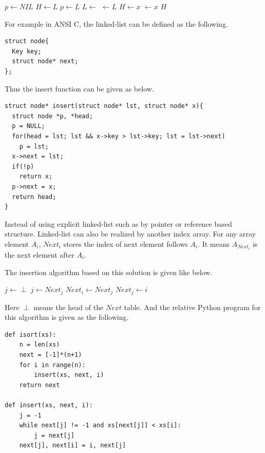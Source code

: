 \documentclass[UTF8]{article}
\begin{document}
\begin{algorithmic}
  \State $p \gets NIL$
  \State $H \gets L$
    \State $p \gets L$
    \State $L \gets $ 
  \EndWhile
  \State {} $\gets L$
    \State $H \gets x$
  \Else
    \State {} $\gets x$
  \EndIf
  \State \Return $H$
\EndFunction
\end{algorithmic}

For example in ANSI C, the linked-list can be defined as the following.

\lstset{language=C}
\begin{lstlisting}
struct node{
  Key key;
  struct node* next;
};
\end{lstlisting}

Thus the insert function can be given as below.

\begin{lstlisting}
struct node* insert(struct node* lst, struct node* x){
  struct node *p, *head;
  p = NULL;
  for(head = lst; lst && x->key > lst->key; lst = lst->next)
    p = lst;
  x->next = lst;
  if(!p)
    return x;
  p->next = x;
  return head;
}
\end{lstlisting}

Instead of using explicit linked-list such as by pointer or reference
based structure. Linked-list can also be realized by another index array.
For any array element $A_i$, $Next_i$ stores the index of next element
follows $A_i$. It means $A_{Next_i}$ is the next element after $A_i$.

The insertion algorithm based on this solution is given like below.

\begin{algorithmic}
  \State $j \gets \perp$
    \State $j \gets Next_j$
  \EndWhile
  \State $Next_i \gets Next_j$
  \State $Next_j \gets i$
\EndFunction
\end{algorithmic}

Here $\perp$ means the head of the $Next$ table.
And the relative Python program for this algorithm is given as the following.

\lstset{language=Python}
\begin{lstlisting}
def isort(xs):
    n = len(xs)
    next = [-1]*(n+1)
    for i in range(n):
        insert(xs, next, i)
    return next

def insert(xs, next, i):
    j = -1
    while next[j] != -1 and xs[next[j]] < xs[i]:
        j = next[j]
    next[j], next[i] = i, next[j]
\end{lstlisting}
\end{document}
